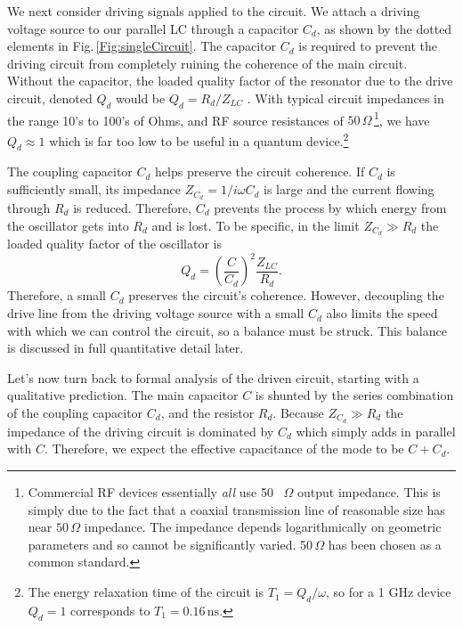  \label{sec:driving}


We next consider driving signals applied to the circuit.
We attach a driving voltage source to our parallel LC through a capacitor $C_d$, as shown by the dotted elements in Fig.\,\ref{Fig:singleCircuit}.
The capacitor $C_d$ is required to prevent the driving circuit from completely ruining the coherence of the main circuit.
Without the capacitor, the loaded quality factor of the resonator due to the drive circuit, denoted $Q_d$ would be $Q_d = R_d / Z_{LC}$ .
With typical circuit impedances in the range 10's to 100's of Ohms, and RF source resistances of $50\,\Omega$\,\footnote{Commercial RF devices essentially \emph{all} use 50 \, $\Omega$ output impedance. This is simply due to the fact that a coaxial transmission line of reasonable size has near $50 \, \Omega$ impedance. The impedance depends logarithmically on geometric parameters and so cannot be significantly varied. 50$ \, \Omega$ has been chosen as a common standard.}, we have $Q_d \approx 1$ which is far too low to be useful in a quantum device.\footnote{The energy relaxation time of the circuit is $T_1 = Q_d / \omega$, so for a 1 GHz device $Q_d=1$ corresponds to $T_1=0.16 \, \text{ns}$.}

The coupling capacitor $C_d$ helps preserve the circuit coherence.
If $C_d$ is sufficiently small, its impedance $Z_{C_d} = 1/i\omega C_d$ is large and the current flowing through $R_d$ is reduced.
Therefore, $C_d$ prevents the process by which energy from the oscillator gets into $R_d$ and is lost.
To be specific, in the limit $Z_{C_d} \gg R_d$ the loaded quality factor of the oscillator is 
\begin{equation}
  Q_d = \left( \frac{C}{C_d} \right)^2 \frac{Z_{LC}}{R_d} .
\end{equation}
Therefore, a small $C_d$ preserves the circuit's coherence.
However, decoupling the drive line from the driving voltage source with a small $C_d$ also limits the speed with which we can control the circuit, so a balance must be struck.
This balance is discussed in full quantitative detail later.

Let's now turn back to formal analysis of the driven circuit, starting with a qualitative prediction.
The main capacitor $C$ is shunted by the series combination of the coupling capacitor $C_d$, and the resistor $R_d$.
Because  $Z_{C_d} \gg R_d$ the impedance of the driving circuit is dominated by $C_d$ which simply adds in parallel with $C$.
Therefore, we expect the effective capacitance of the mode to be $C+C_d$.


